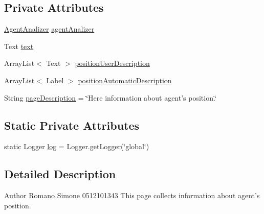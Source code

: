 \subsection*{Private Attributes}
\begin{DoxyCompactItemize}
\item 
\hyperlink{classit_1_1isislab_1_1masonhelperdocumentation_1_1analizer_1_1_agent_analizer}{Agent\-Analizer} \hyperlink{classit_1_1isislab_1_1masonhelperdocumentation_1_1mason_1_1wizards_1_1_e___agent_position_page_a2d464b9b75c99b576f5e23fc3b1d9c4a}{agent\-Analizer}
\item 
Text \hyperlink{classit_1_1isislab_1_1masonhelperdocumentation_1_1mason_1_1wizards_1_1_e___agent_position_page_af6426f8de0e43846a74703addf28a63a}{text}
\item 
Array\-List$<$ Text $>$ \hyperlink{classit_1_1isislab_1_1masonhelperdocumentation_1_1mason_1_1wizards_1_1_e___agent_position_page_af9f6fb6ec50925fea7b1bf932718c3af}{position\-User\-Description}
\item 
Array\-List$<$ Label $>$ \hyperlink{classit_1_1isislab_1_1masonhelperdocumentation_1_1mason_1_1wizards_1_1_e___agent_position_page_ad8c6b4b4f5efd73f4e653ddeddd6bc2d}{position\-Automatic\-Description}
\item 
String \hyperlink{classit_1_1isislab_1_1masonhelperdocumentation_1_1mason_1_1wizards_1_1_e___agent_position_page_a30f0423e7a3b2c7d2c7968be533f169e}{page\-Description} = \char`\"{}Here information about agent's position.\char`\"{}
\end{DoxyCompactItemize}
\subsection*{Static Private Attributes}
\begin{DoxyCompactItemize}
\item 
static Logger \hyperlink{classit_1_1isislab_1_1masonhelperdocumentation_1_1mason_1_1wizards_1_1_e___agent_position_page_a2630d64e460ca662aaa8e1ddecfa60ed}{log} = Logger.\-get\-Logger(\char`\"{}global\char`\"{})
\end{DoxyCompactItemize}


\subsection{Detailed Description}
\begin{DoxyAuthor}{Author}
Romano Simone 0512101343 This page collects information about agent's position. 
\end{DoxyAuthor}


